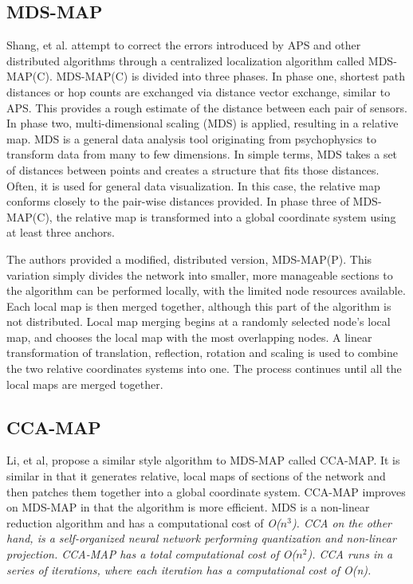\subsection{MDS-MAP}
Shang, et al. attempt to correct the errors introduced by APS and other distributed algorithms through a centralized localization algorithm called MDS-MAP(C)\cite{MDS-MAP}.  MDS-MAP(C) is divided into three phases.  In phase one, shortest path distances or hop counts are exchanged via distance vector exchange, similar to APS.  This provides a rough estimate of the distance between each pair of sensors.  In phase two, multi-dimensional scaling (MDS) is applied, resulting in a relative map.  MDS is a general data analysis tool originating from psychophysics to transform data from many to few dimensions.  In simple terms, MDS takes a set of distances between points and creates a structure that fits those distances.  Often, it is used for general data visualization.  In this case, the relative map conforms closely to the pair-wise distances provided.  In phase three of MDS-MAP(C), the relative map is transformed into a global coordinate system using at least three anchors.  

The authors provided a modified, distributed version, MDS-MAP(P)\cite{MDS-MAP-P}.  This variation simply divides the network into smaller, more manageable sections to the algorithm can be performed locally, with the limited node resources available.  Each local map is then merged together, although this part of the algorithm is not distributed.  Local map merging begins at a randomly selected node's local map, and chooses the local map with the most overlapping nodes.  A linear transformation of translation, reflection, rotation and scaling is used to combine the two relative coordinates systems into one.  The process continues until all the local maps are merged together. 

\subsection{CCA-MAP} \label{sec:CCA-MAP}
Li, et al, propose a similar style algorithm to MDS-MAP called CCA-MAP\cite{CCA-MAP07,CCA-MAP09}.  It is similar in that it generates relative, local maps of sections of the network and then patches them together into a global coordinate system.  CCA-MAP improves on MDS-MAP in that the algorithm is more efficient.  MDS is a non-linear reduction algorithm and has a computational cost of \em{O($n^{3}$)}.  CCA\cite{CCA} on the other hand, is a self-organized neural network performing quantization and non-linear projection.  CCA-MAP has a total computational cost of \em{O($n^{2}$)}.  CCA runs in a series of iterations, where each iteration has a computational cost of \em{O(n)}.

